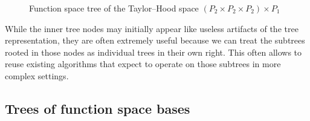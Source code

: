 \documentclass[a4paper,10pt,headings=normal,bibliography=totoc]{scrartcl}
\begin{document}
\begin{figure}
    \begin{center}
    \end{center}
    \caption{Function space tree of the Taylor--Hood space $(P_2 \times P_2 \times P_2)\times P_1$}
    \label{fig:taylor_hood_space_tree}
\end{figure}

While the inner tree nodes may initially appear like useless artifacts of the tree representation, they are often extremely useful
because we can treat the subtrees rooted in those nodes as individual trees in their own right.
This often allows to
reuse existing algorithms that expect to operate on those subtrees in more complex settings.


\subsection{Trees of function space bases}
\label{sec:basistree}
\end{document}
